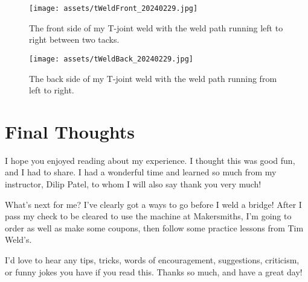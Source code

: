 \documentclass{article}
\begin{document}
\begin{figure}[h]
\caption{The front side of my T-joint weld with the weld path running left to right between two tacks.}
\texttt{[image: assets/tWeldFront\_20240229.jpg]}
\label{tJoint1}
\end{figure}

\begin{figure}[h]
\caption{The back side of my T-joint weld with the weld path running from left to right.}
\texttt{[image: assets/tWeldBack\_20240229.jpg]}
\label{tJoint2}
\end{figure}

\section*{Final Thoughts}

I hope you enjoyed reading about my experience. I thought this was good fun, and I had to share. I had a wonderful time and learned so much from my instructor, Dilip Patel, to whom I will also say thank you very much!

What's next for me? I've clearly got a ways to go before I weld a bridge! After I pass my check to be cleared to use the machine at Makersmiths, I'm going to order as well as make some coupons, then follow some practice lessons from Tim Weld's.

I'd love to hear any tips, tricks, words of encouragement, suggestions, criticism, or funny jokes you have if you read this. Thanks so much, and have a great day!
\end{document}
